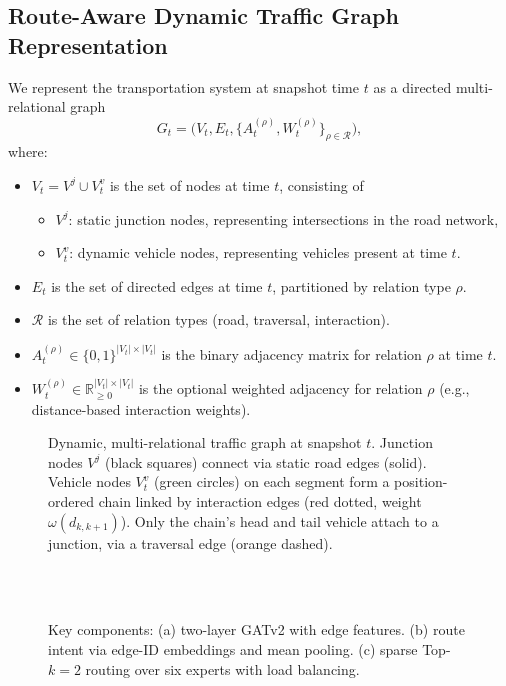 \subsection{Route-Aware Dynamic Traffic Graph Representation}\label{sec:dynamic-graph}
We represent the transportation system at snapshot time $t$ as a directed multi-relational graph
\begin{equation}
G_t = \big(V_t, E_t, \{A_t^{(\rho)}, W_t^{(\rho)}\}_{\rho\in\mathcal{R}}\big),
\end{equation}
where:
\begin{itemize}
    \item $V_t = V^j \cup V_t^v$ is the set of nodes at time $t$, consisting of
        \begin{itemize}
            \item $V^j$: static junction nodes, representing intersections in the road network,
            \item $V_t^v$: dynamic vehicle nodes, representing vehicles present at time $t$.
        \end{itemize}
    \item $E_t$ is the set of directed edges at time $t$, partitioned by relation type $\rho$.
    \item $\mathcal{R}$ is the set of relation types (road, traversal, interaction).
    \item $A_t^{(\rho)} \in \{0,1\}^{|V_t|\times |V_t|}$ is the binary adjacency matrix for relation $\rho$ at time $t$.
    \item $W_t^{(\rho)} \in \mathbb{R}_{\ge 0}^{|V_t|\times |V_t|}$ is the optional weighted adjacency for relation $\rho$ (e.g., distance-based interaction weights).
\end{itemize}

\begin{figure}[t]
    \centering
    \resizebox{0.95\linewidth}{!}{}
    \caption{Dynamic, multi-relational traffic graph at snapshot $t$. Junction nodes $V^j$ (black squares) connect via static road edges (solid). Vehicle nodes $V_t^v$ (green circles) on each segment form a position-ordered chain linked by interaction edges (red dotted, weight $\omega(d_{k,k+1})$). Only the chain's head and tail vehicle attach to a junction, via a traversal edge (orange dashed).}\label{fig:dyn-graph}
\end{figure}

\begin{figure}[t]
    \centering
    \\[2mm]
    \\[2mm]
    \caption{Key components: (a) two-layer GATv2 with edge features. (b) route intent via edge-ID embeddings and mean pooling. (c) sparse Top-$k=2$ routing over six experts with load balancing.}\label{fig:components}
\end{figure}


